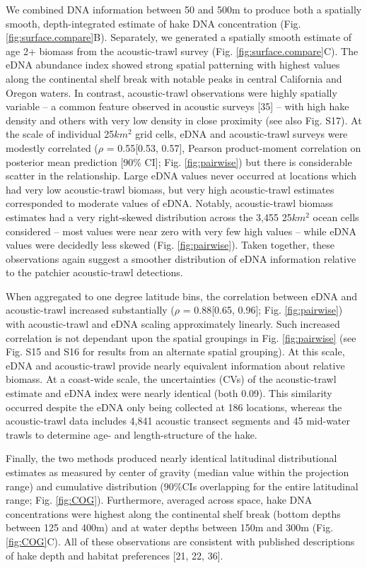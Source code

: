 \documentclass[
]{article}
\begin{document}
We combined DNA information between 50 and 500m to produce both a
spatially smooth, depth-integrated estimate of hake DNA concentration
(Fig. \ref{fig:surface.compare}B). Separately, we generated a spatially
smooth estimate of age 2+ biomass from the acoustic-trawl survey (Fig.
\ref{fig:surface.compare}C). The eDNA abundance index showed strong spatial patterning
with highest values along the continental shelf break with notable peaks
in central California and Oregon waters. In contrast, acoustic-trawl
observations were highly spatially variable -- a common feature observed in
acoustic surveys {[}35{]} -- with high hake density and
others with very low density in close proximity (see also Fig. S17).
At the scale of individual 25\(km^2\) grid cells, eDNA and acoustic-trawl
surveys were modestly correlated (\(\rho\) = 0.55{[}0.53, 0.57{]},
Pearson product-moment correlation on posterior mean prediction {[}90\%
CI{]}; Fig. \ref{fig:pairwise}) but there is considerable scatter in the
relationship. Large eDNA values never occurred at locations which had
very low acoustic-trawl biomass, but very high acoustic-trawl estimates corresponded
to moderate values of eDNA. Notably, acoustic-trawl biomass estimates had a
very right-skewed distribution across the 3,455 25\(km^2\) ocean cells
considered -- most values were near zero with very few high values --
while eDNA values were decidedly less skewed (Fig. \ref{fig:pairwise}).
Taken together, these observations again suggest a smoother distribution
of eDNA information relative to the patchier acoustic-trawl detections.

When aggregated to one degree latitude bins, the correlation between
eDNA and acoustic-trawl increased substantially (\(\rho\) = 0.88{[}0.65,
0.96{]}; Fig. \ref{fig:pairwise}) with acoustic-trawl and eDNA scaling
approximately linearly. Such increased correlation is not dependant upon
the spatial groupings in Fig. \ref{fig:pairwise} (see Fig. S15 and
S16 for results from an alternate spatial grouping). At this scale, eDNA
and acoustic-trawl provide nearly equivalent information about relative
biomass. At a coast-wide scale, the uncertainties (CVs) of the
acoustic-trawl estimate and eDNA index were nearly identical (both 0.09). 
This similarity occurred despite the eDNA only
being collected at 186 locations, whereas the acoustic-trawl data
includes 4,841 acoustic transect segments and 45 mid-water trawls to
determine age- and length-structure of the hake.

Finally, the two methods produced nearly identical latitudinal
distributional estimates as measured by center of gravity (median value
within the projection range) and cumulative distribution (\(90\%\)CIs
overlapping for the entire latitudinal range; Fig. \ref{fig:COG}).
Furthermore, averaged across space, hake DNA concentrations were highest
along the continental shelf break (bottom depths between 125 and 400m)
and at water depths between 150m and 300m (Fig. \ref{fig:COG}C). All of
these observations are consistent with published descriptions of hake
depth and habitat preferences {[}21, 22, 36{]}.
\end{document}
